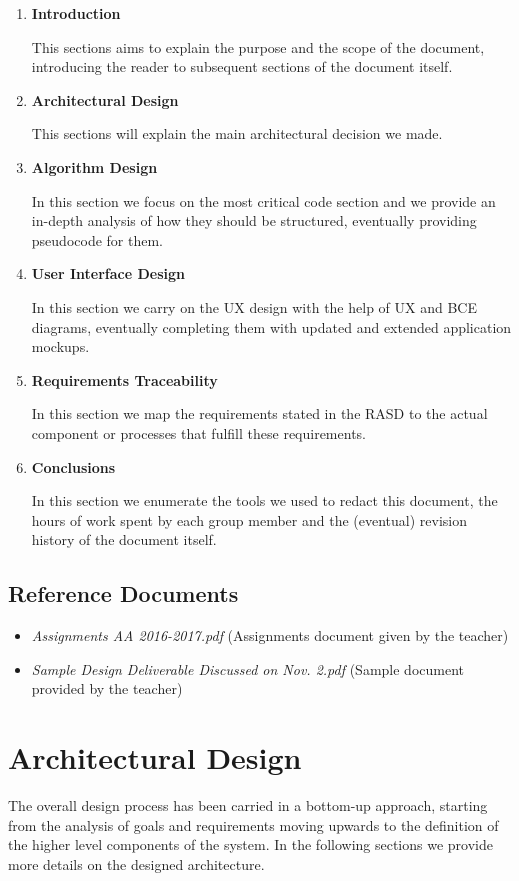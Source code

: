 \documentclass[11pt]{article} %
\begin{document}
\begin{enumerate}
	\item \textbf{Introduction}

	This sections aims to explain the purpose and the scope of the document, introducing the reader to subsequent sections of the document itself.

	\item \textbf{Architectural Design}
	 
	This sections will explain the main architectural decision we made.

	\item \textbf{Algorithm Design}

	In this section we focus on the most critical code section and we provide an in-depth analysis of how they should be structured, eventually providing pseudocode for them.
	
	\item \textbf{User Interface Design}

	In this section we carry on the UX design with the help of UX and BCE diagrams, eventually completing them with updated and extended application mockups.

	\item \textbf{Requirements Traceability}
	
	In this section we map the requirements stated in the RASD to the actual component or processes that fulfill these requirements.

	\item \textbf{Conclusions}

	In this section we enumerate the tools we used to redact this document, the hours of work spent by each group member and the (eventual) revision history of the document itself.
\end{enumerate}

\subsection{Reference Documents}
\begin{itemize}
	\item \textit{Assignments AA 2016-2017.pdf} (Assignments document given by the teacher)
	\item \textit{Sample Design Deliverable Discussed on Nov. 2.pdf} (Sample document provided by the teacher)
  \end{itemize}




\newpage
\section{Architectural Design}
The overall design process has been carried in a bottom-up approach, starting from the analysis of goals and requirements moving upwards to the definition of the higher level components of the system. In the following sections we provide more details on the designed architecture.
\end{document}
